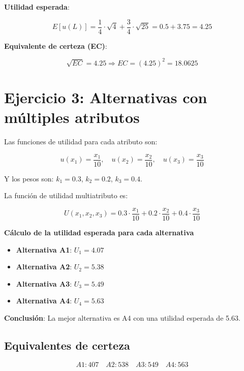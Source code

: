 \documentclass{article}
\begin{document}
	\textbf{Utilidad esperada}:
	
	\[
	E[u(L)] = \frac{1}{4} \cdot \sqrt{4} + \frac{3}{4} \cdot \sqrt{25} = 0.5 + 3.75 = 4.25
	\]
	
	\textbf{Equivalente de certeza (EC)}:
	
	\[
	\sqrt{EC} = 4.25 \Rightarrow EC = (4.25)^2 = 18.0625
	\]
	
	\section*{Ejercicio 3: Alternativas con múltiples atributos}
	
	Las funciones de utilidad para cada atributo son:
	
	\[
	u(x_1) = \frac{x_1}{10}, \quad u(x_2) = \frac{x_2}{10}, \quad u(x_3) = \frac{x_3}{10}
	\]
	
	Y los pesos son: $k_1 = 0.3$, $k_2 = 0.2$, $k_3 = 0.4$.
	
	La función de utilidad multiatributo es:
	
	\[
	U(x_1, x_2, x_3) = 0.3 \cdot \frac{x_1}{10} + 0.2 \cdot \frac{x_2}{10} + 0.4 \cdot \frac{x_3}{10}
	\]
	
	\textbf{Cálculo de la utilidad esperada para cada alternativa}
	
	\begin{itemize}
		\item \textbf{Alternativa A1}: $U_1 = 4.07$
		\item \textbf{Alternativa A2}: $U_2 = 5.38$
		\item \textbf{Alternativa A3}: $U_3 = 5.49$
		\item \textbf{Alternativa A4}: $U_4 = 5.63$
	\end{itemize}
	
	\textbf{Conclusión}: La mejor alternativa es A4 con una utilidad esperada de 5.63.
	
	\subsection*{Equivalentes de certeza}
	
	\[
	A1: 407 \quad A2: 538 \quad A3: 549 \quad A4: 563
	\]
	
\end{document}
